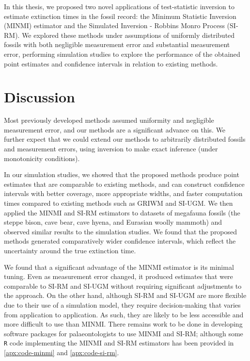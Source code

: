 
In this thesis, we proposed two novel applications of test-statistic inversion to estimate extinction times in the fossil record: the Minimum Statistic Inversion (MINMI) estimator and the Simulated Inversion - Robbins Monro Process (SI-RM). We explored these methods under assumptions of uniformly distributed fossils with both negligible measurement error and substantial measurement error, performing simulation studies to explore the performance of the obtained point estimates and confidence intervals in relation to existing methods.

\section{Discussion}

Most previously developed methods assumed uniformity and negligible measurement error, and our methods are a significant advance on this. We further expect that we could extend our methods to arbitrarily distributed fossils and measurement errors, using inversion to make exact inference (under monotonicity conditions).

In our simulation studies, we showed that the proposed methods produce point estimates that are comparable to existing methods, and can construct confidence intervals with better coverage, more appropriate widths, and faster computation times compared to existing methods such as GRIWM and SI-UGM. We then applied the MINMI and SI-RM estimators to datasets of megafauna fossils (the steppe bison, cave bear, cave hyena, and Eurasian woolly mammoth) and observed similar results to the simulation studies. We found that the proposed methods generated comparatively wider confidence intervals, which reflect the uncertainty around the true extinction time.

We found that a significant advantage of the MINMI estimator is its minimal tuning. Even as measurement error changed, it produced estimates that were comparable to SI-RM and SI-UGM without requiring significant adjustments to the approach. On the other hand, although SI-RM and SI-UGM are more flexible due to their use of a simulation model, they require decision-making that varies from application to application. As such, they are likely to be less accessible and more difficult to use than MINMI. There remains work to be done in developing software packages for palaeontologists to use MINMI and SI-RM; although some \texttt{R} code implementing the MINMI and SI-RM estimators has been provided in \autoref{apx:code-minmi} and \autoref{apx:code-si-rm}.

